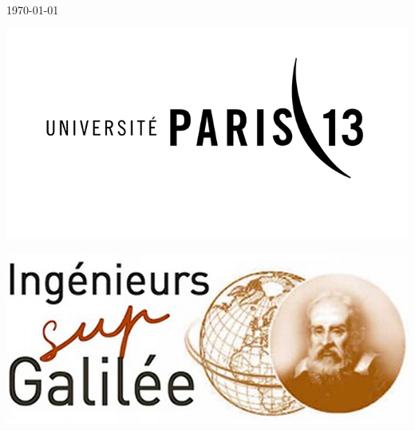 \begin{titlepage}
\begin{center}
		\vfill			
		{\large \today}
		\vfill
		\begin{minipage}{0.35\textwidth}
			\begin{flushleft}
				\includegraphics[width=1\textwidth]{../img/UP13.png}			
			\end{flushleft}
		\end{minipage}
		\hfill
		\begin{minipage}{0.35\textwidth}
			\begin{flushright}
				\includegraphics[width=1\textwidth]{../img/sup-galile.png}
			\end{flushright}
		\end{minipage}
		
									
	\end{center}		
\end{titlepage}
